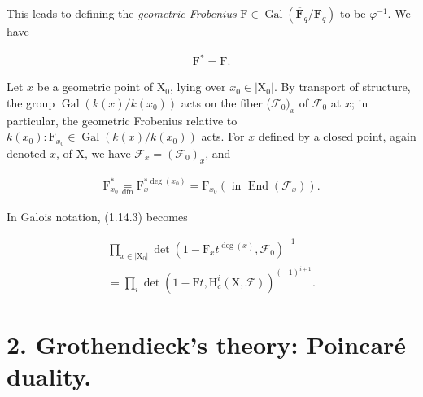 \documentclass[10pt,leqno]{article}
\begin{document}
\noindent This leads to defining the \emph{geometric Frobenius} \(\mathrm{F}\in \operatorname{Gal}(\overline{\mathbf{F}}_{q}/\mathbf{F}_{q})\) to be \(\varphi ^{- 1}\). We have\par

\begin{equation*}\begin{gathered}\mathrm{F}^{*} = \mathrm{F}.\end{gathered}\tag{1.15.1}\end{equation*}

\noindent Let \(x\) be a geometric point of \(\mathrm{X}_{0}\), lying over \(x_{0}\in |\mathrm{X}_{0}|\). By transport of structure, the group \(\operatorname{Gal}(k(x)/k(x_{0}))\) acts on the fiber (\(\mathcal{F} _{0})_{x}\) of \(\mathcal{F} _{0}\) at \(x\); in particular, the geometric Frobenius relative to \(k(x_{0}) : \mathrm{F}_{x_{0}}\in \operatorname{Gal}(k(x)/k(x_{0}))\) acts. For \(x\) defined by a closed point, again denoted \(x\), of \(\mathrm{X}\), we have \(\mathcal{F} _{x}=(\mathcal{F} _{0})_{x}\), and\par

\begin{equation*}\begin{gathered}\mathrm{F}_{x_{0}}^{*} \underset{\mathrm{dfn}}{=} \mathrm{F}_{x}^{*\operatorname{deg}(x_{0})} = \mathrm{F}_{x_{0}}    (\text{ in }\operatorname{End}(\mathcal{F} _{x})).\end{gathered}\tag{1.15.2}\end{equation*}

\noindent In Galois notation, (1.14.3) becomes\par

\begin{equation*}\begin{gathered}\prod _{x\in |\mathrm{X}_{0}|} \operatorname{det}(1- \mathrm{F}_{x} t^{\operatorname{deg}(x)},\mathcal{F} _{0})^{- 1} \\ = \prod _{i} \operatorname{det}(1- \mathrm{F}t,\mathrm{H}_{c}^{i}(\mathrm{X},\mathcal{F} ))^{(- 1)^{i+1}}.\end{gathered}\end{equation*}

\clearpage

\label{physical-9}

\section*{2. Grothendieck’s theory: Poincaré duality.}
\end{document}
